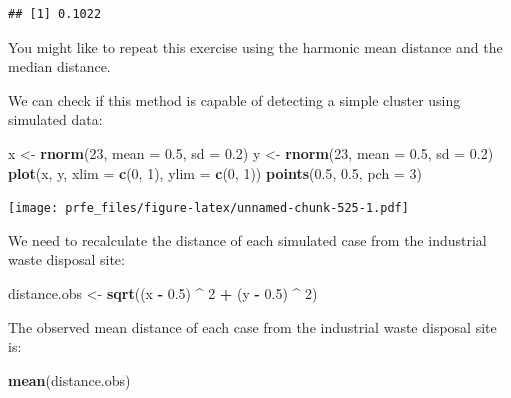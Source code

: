 \documentclass[12pt,a4paper]{book}
\newenvironment{Shaded}{\begin{snugshade}}{\end{snugshade}}
\newcommand{\DataTypeTok}[1]{\textcolor[rgb]{0.13,0.29,0.53}{#1}}
\newcommand{\DecValTok}[1]{\textcolor[rgb]{0.00,0.00,0.81}{#1}}
\newcommand{\FloatTok}[1]{\textcolor[rgb]{0.00,0.00,0.81}{#1}}
\newcommand{\KeywordTok}[1]{\textcolor[rgb]{0.13,0.29,0.53}{\textbf{#1}}}
\newcommand{\NormalTok}[1]{#1}
\newcommand{\OperatorTok}[1]{\textcolor[rgb]{0.81,0.36,0.00}{\textbf{#1}}}
\newcommand{\StringTok}[1]{\textcolor[rgb]{0.31,0.60,0.02}{#1}}
\theoremstyle{definition}
\theoremstyle{definition}
\theoremstyle{definition}
\theoremstyle{remark}
\begin{document}
\begin{verbatim}
## [1] 0.1022
\end{verbatim}

You might like to repeat this exercise using the harmonic mean distance
and the median distance.

We can check if this method is capable of detecting a simple cluster
using simulated data:

\begin{Shaded}
\begin{Highlighting}[]
\NormalTok{x <-}\StringTok{ }\KeywordTok{rnorm}\NormalTok{(}\DecValTok{23}\NormalTok{, }\DataTypeTok{mean =} \FloatTok{0.5}\NormalTok{, }\DataTypeTok{sd =} \FloatTok{0.2}\NormalTok{)}
\NormalTok{y <-}\StringTok{ }\KeywordTok{rnorm}\NormalTok{(}\DecValTok{23}\NormalTok{, }\DataTypeTok{mean =} \FloatTok{0.5}\NormalTok{, }\DataTypeTok{sd =} \FloatTok{0.2}\NormalTok{)}
\KeywordTok{plot}\NormalTok{(x, y, }\DataTypeTok{xlim =} \KeywordTok{c}\NormalTok{(}\DecValTok{0}\NormalTok{, }\DecValTok{1}\NormalTok{), }\DataTypeTok{ylim =} \KeywordTok{c}\NormalTok{(}\DecValTok{0}\NormalTok{, }\DecValTok{1}\NormalTok{))}
\KeywordTok{points}\NormalTok{(}\FloatTok{0.5}\NormalTok{, }\FloatTok{0.5}\NormalTok{, }\DataTypeTok{pch =} \DecValTok{3}\NormalTok{)}
\end{Highlighting}
\end{Shaded}

\texttt{[image: prfe\_files/figure-latex/unnamed-chunk-525-1.pdf]}

We need to recalculate the distance of each simulated case from the
industrial waste disposal site:

\begin{Shaded}
\begin{Highlighting}[]
\NormalTok{distance.obs <-}\StringTok{ }\KeywordTok{sqrt}\NormalTok{((x }\OperatorTok{-}\StringTok{ }\FloatTok{0.5}\NormalTok{) }\OperatorTok{^}\StringTok{ }\DecValTok{2} \OperatorTok{+}\StringTok{ }\NormalTok{(y }\OperatorTok{-}\StringTok{ }\FloatTok{0.5}\NormalTok{) }\OperatorTok{^}\StringTok{ }\DecValTok{2}\NormalTok{)}
\end{Highlighting}
\end{Shaded}

The observed mean distance of each case from the industrial waste
disposal site is:

\begin{Shaded}
\begin{Highlighting}[]
\KeywordTok{mean}\NormalTok{(distance.obs)}
\end{Highlighting}
\end{Shaded}
\end{document}
